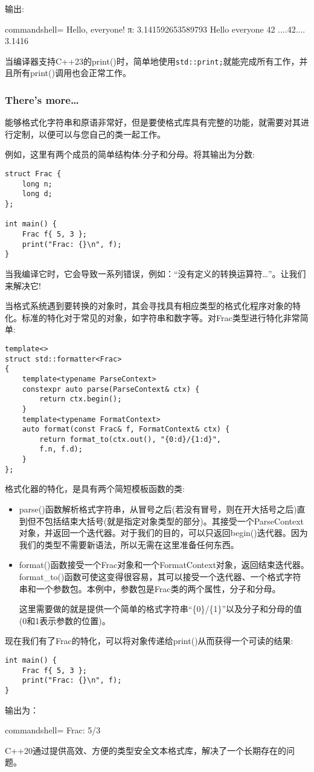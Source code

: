 输出:

\begin{tcblisting}{commandshell={}}
Hello, everyone!
π: 3.141592653589793
Hello everyone 42
....42....
3.1416
\end{tcblisting}

当编译器支持C++23的print()时，简单地使用\texttt{std::print;}就能完成所有工作，并且所有print()调用也会正常工作。

\subsubsection{There's more…}

能够格式化字符串和原语非常好，但是要使格式库具有完整的功能，就需要对其进行定制，以便可以与您自己的类一起工作。

例如，这里有两个成员的简单结构体:分子和分母。将其输出为分数:

\begin{lstlisting}[style=styleCXX]
struct Frac {
	long n;
	long d;
};

int main() {
	Frac f{ 5, 3 };
	print("Frac: {}\n", f);
}
\end{lstlisting}

当我编译它时，它会导致一系列错误，例如：“没有定义的转换运算符…”。让我们来解决它!

当格式系统遇到要转换的对象时，其会寻找具有相应类型的格式化程序对象的特化。标准的特化对于常见的对象，如字符串和数字等。对Frac类型进行特化非常简单:

\begin{lstlisting}[style=styleCXX]
template<>
struct std::formatter<Frac>
{
	template<typename ParseContext>
	constexpr auto parse(ParseContext& ctx) {
		return ctx.begin();
	}
	template<typename FormatContext>
	auto format(const Frac& f, FormatContext& ctx) {
		return format_to(ctx.out(), "{0:d}/{1:d}",
		f.n, f.d);
	}
};
\end{lstlisting}

格式化器的特化，是具有两个简短模板函数的类:

\begin{itemize}
\item 
parse()函数解析格式字符串，从冒号之后(若没有冒号，则在开大括号之后)直到但不包括结束大括号(就是指定对象类型的部分)。其接受一个ParseContext对象，并返回一个迭代器。对于我们的目的，可以只返回begin()迭代器。因为我们的类型不需要新语法，所以无需在这里准备任何东西。

\item 
format()函数接受一个Frac对象和一个FormatContext对象，返回结束迭代器。format\_to()函数可使这变得很容易，其可以接受一个迭代器、一个格式字符串和一个参数包。本例中，参数包是Frac类的两个属性，分子和分母。

这里需要做的就是提供一个简单的格式字符串“\{0\}/\{1\}”以及分子和分母的值(0和1表示参数的位置)。
\end{itemize}

现在我们有了Frac的特化，可以将对象传递给print()从而获得一个可读的结果:

\begin{lstlisting}[style=styleCXX]
int main() {
	Frac f{ 5, 3 };
	print("Frac: {}\n", f);
}
\end{lstlisting}

输出为：

\begin{tcblisting}{commandshell={}}
Frac: 5/3
\end{tcblisting}

C++20通过提供高效、方便的类型安全文本格式库，解决了一个长期存在的问题。

